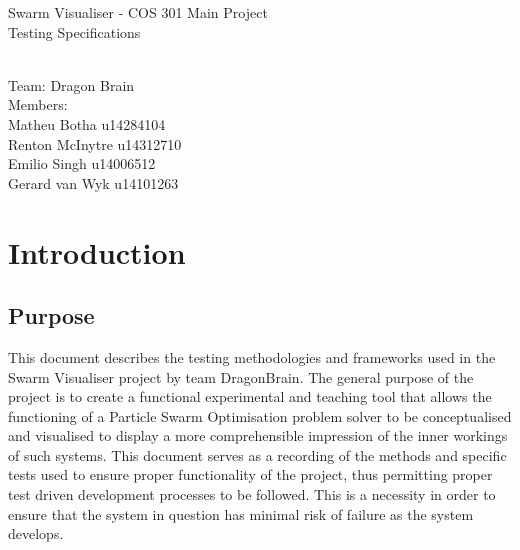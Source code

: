 \documentclass[11pt]{article}
\begin{document}
\begin{titlepage}

\begin{center}
\begin{huge}
Swarm Visualiser - COS 301 Main Project
\\
Testing Specifications
\begin{small}
\\
Team: Dragon Brain
\\
Members:
\\
Matheu Botha u14284104
\\
Renton McInytre u14312710
\\
Emilio Singh u14006512
\\
Gerard van Wyk u14101263

\end{small}

\end{huge}
\end{center}
\end{titlepage}

\pagebreak

\tableofcontents

\pagebreak
\section{Introduction}
\subsection{Purpose}
This document describes the testing methodologies and frameworks used in the Swarm Visualiser project by team DragonBrain. The general purpose of the project is to create a functional experimental and teaching tool that allows the functioning of a Particle Swarm Optimisation problem solver to be conceptualised and visualised to display a more comprehensible impression of the inner workings of such systems.
\newline This document serves as a recording of the methods and specific tests used to ensure proper functionality of the project, thus permitting proper test driven development processes to be followed. This is a necessity in order to ensure that the system in question has minimal risk of failure as the system develops.
\end{document}
